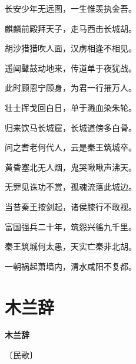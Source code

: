 \documentclass[12pt,UTF-8,openany,fontset=none]{ctexbook}
\begin{document}
\begin{center}
    \begin{Large}

        长安少年无远图，一生惟羡执金吾。

        麒麟前殿拜天子，走马西击长城胡。

        胡沙猎猎吹人面，汉虏相逢不相见。

        遥闻鼙鼓动地来，传道单于夜犹战。

        此时顾恩宁顾身，为君一行摧万人。

        壮士挥戈回白日，单于溅血染朱轮。

        归来饮马长城窟，长城道傍多白骨。

        问之耆老何代人，云是秦王筑城卒。

        黄昏塞北无人烟，鬼哭啾啾声沸天。

        无罪见诛功不赏，孤魂流落此城边。

        当昔秦王按剑起，诸侯膝行不敢视。

        富国强兵二十年，筑怨兴徭九千里。

        秦王筑城何太愚，天实亡秦非北胡。

        一朝祸起萧墙内，渭水咸阳不复都。

    \end{Large}

\end{center}

\vspace{8pt}
\clearpage

\section{木兰辞}


\begin{center}
    {\bfseries 木兰辞}

    \vspace{18pt}

    \begin{large}\xuwen
        〔民歌〕
    \end{large}

\end{center}

    \vspace{18pt}  %
\end{document}

